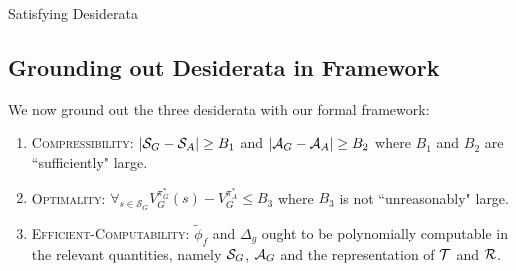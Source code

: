 Satisfying Desiderata


\subsection{Grounding out Desiderata in Framework}

We now ground out the three desiderata with our formal framework:

\begin{enumerate}
\item \textsc{Compressibility}: $|\mathcal{S}_G - \mathcal{S}_A| \geq B_1$ and $|\mathcal{A}_G - \mathcal{A}_A| \geq B_2$ where $B_1$ and $B_2$ are ``sufficiently" large.

\item \textsc{Optimality}: $\forall_{s \in \mathcal{S}_G} V_G^{\pi_G^*}(s) - V_G^{\pi_{A}^*} \leq B_3$ where $B_3$ is not ``unreasonably" large.

\item \textsc{Efficient-Computability}: $\widetilde{\phi}_f$ and $\Delta_g$ ought to be polynomially computable in the relevant quantities, namely $\mathcal{S}_G$, $\mathcal{A}_G$ and the representation of $\mathcal{T}$ and $\mathcal{R}$.
\end{enumerate}


